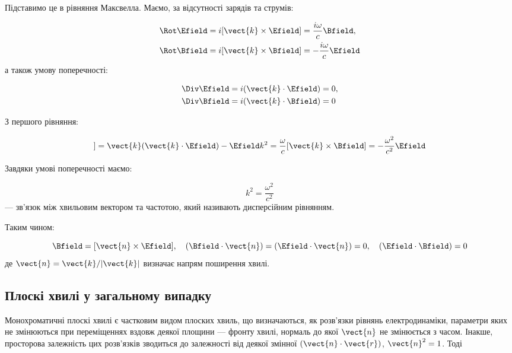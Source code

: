 Підставимо це в рівняння Максвелла. Маємо, за відсутності зарядів та струмів:

\begin{align*}
\Rot\Efield &= i[\vect{k} \times \Efield] = \frac{i\omega}{c} \Bfield, \\
\Rot\Bfield &= i[\vect{k} \times \Bfield] = -\frac{i\omega}{c} \Efield
\end{align*}
а також умову поперечності:

\begin{align*}
\Div\Efield &= i(\vect{k} \cdot \Efield) = 0, \\
\Div\Bfield &= i(\vect{k} \cdot \Bfield) = 0
\end{align*}

З першого рівняння:

\begin{equation*}
[\vect{k} \times [\vect{k} \times \Efield]] = \vect{k}(\vect{k} \cdot \Efield) - \Efield k^2 = \frac{\omega}{c}[\vect{k} \times \Bfield] =
-\frac{\omega^2}{c^2} \Efield
\end{equation*}

Завдяки умові поперечності маємо:

\begin{equation*}
k^2 = \frac{\omega^2}{c^2}
\label{eq:dispersion_relation}
\end{equation*}
--- зв’язок між хвильовим вектором та частотою, який називають дисперсійним рівнянням.

Таким чином:

\begin{equation*}
\Bfield = [\vect{n} \times \Efield], \quad (\Bfield \cdot \vect{n}) = (\Efield \cdot \vect{n}) = 0, \quad (\Efield \cdot \Bfield) = 0
\label{eq:wave_properties}
\end{equation*}
де \(\vect{n} = \vect{k} / |\vect{k}|\) визначає напрям поширення хвилі.

\subsection*{Плоскі хвилі у загальному випадку}

Монохроматичні плоскі хвилі є частковим видом плоских хвиль, що визначаються, як розв’язки рівнянь електродинаміки, параметри яких не
змінюються при переміщеннях вздовж деякої площини --- фронту хвилі, нормаль до якої \(\vect{n}\) не змінюється з часом. Інакше, просторова залежність
цих розв’язків зводиться до залежності від деякої змінної \((\vect{n} \cdot \vect{r})\), \(\vect{n}^2 = 1\). Тоді

